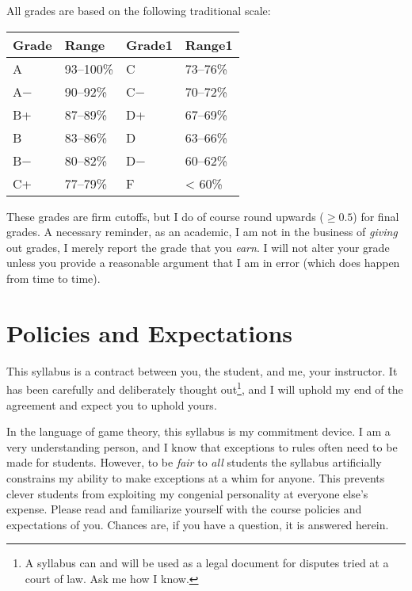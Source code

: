 \documentclass{article}
\begin{document}
All grades are based on the following traditional scale:

\begin{center}

\begin{tabular}{llll}
\toprule
Grade & Range & Grade1 & Range1\\
\midrule
A & 93–100\% & C & 73–76\%\\
A− & 90–92\% & C− & 70–72\%\\
B+ & 87–89\% & D+ & 67–69\%\\
B & 83–86\% & D & 63–66\%\\
B− & 80–82\% & D− & 60–62\%\\
\addlinespace
C+ & 77–79\% & F & < 60\%\\
\bottomrule
\end{tabular}
\end{center}

These grades are firm cutoffs, but I do of course round upwards
(\(\geq 0.5\)) for final grades. A necessary reminder, as an academic, I
am not in the business of \emph{giving} out grades, I merely report the
grade that you \emph{earn}. I will not alter your grade unless you
provide a reasonable argument that I am in error (which does happen from
time to time).

\hypertarget{policies-and-expectations}{%
\section{Policies and Expectations}\label{policies-and-expectations}}

This syllabus is a contract between you, the student, and me, your
instructor. It has been carefully and deliberately thought out\footnote{A
  syllabus can and will be used as a legal document for disputes tried
  at a court of law. Ask me how I know.}, and I will uphold my end of
the agreement and expect you to uphold yours.

In the language of game theory, this syllabus is my commitment device. I
am a very understanding person, and I know that exceptions to rules
often need to be made for students. However, to be \emph{fair} to
\emph{all} students the syllabus artificially constrains my ability to
make exceptions at a whim for anyone. This prevents clever students from
exploiting my congenial personality at everyone else's expense. Please
read and familiarize yourself with the course policies and expectations
of you. Chances are, if you have a question, it is answered herein.
\end{document}
